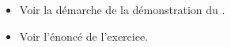\begin{itemize}
    \item Voir la démarche de la démonstration du .
    \item Voir l'énoncé de l'exercice. 
\end{itemize}